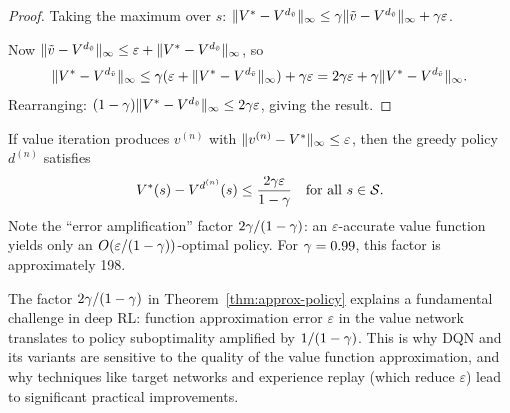 \documentclass[11pt,a4paper]{article}
\begin{document}
\begin{proof}
Taking the maximum over $s$:
$\|V^* - V^{d_{\tilde{v}}}\|_\infty \leq
\gamma \|\tilde{v} - V^{d_{\tilde{v}}}\|_\infty +
\gamma\varepsilon$.

Now $\|\tilde{v} - V^{d_{\tilde{v}}}\|_\infty \leq
\varepsilon + \|V^* - V^{d_{\tilde{v}}}\|_\infty$, so
\[
    \|V^* - V^{d_{\tilde{v}}}\|_\infty \leq
    \gamma(\varepsilon + \|V^* - V^{d_{\tilde{v}}}\|_\infty)
    + \gamma\varepsilon
    = 2\gamma\varepsilon +
    \gamma \|V^* - V^{d_{\tilde{v}}}\|_\infty.
\]
Rearranging: $(1-\gamma)\|V^* - V^{d_{\tilde{v}}}\|_\infty
\leq 2\gamma\varepsilon$, giving the result.
\end{proof}

\begin{keyresult}[title={Near-Optimal Policy from Approximate VI}]
\label{kr:near-optimal}
If value iteration produces $v^{(n)}$ with
$\|v^{(n)} - V^*\|_\infty \leq \varepsilon$, then the greedy
policy $d^{(n)}$ satisfies
\[
    V^*(s) - V^{d^{(n)}}(s) \leq
    \frac{2\gamma\varepsilon}{1-\gamma}
    \quad \text{for all } s \in \mathcal{S}.
\]
Note the ``error amplification'' factor $2\gamma/(1-\gamma)$:
an $\varepsilon$-accurate value function yields only an
$O(\varepsilon/(1-\gamma))$-optimal policy. For
$\gamma = 0.99$, this factor is approximately 198.
\end{keyresult}

\begin{rlconnection}[title={Error Amplification in Deep RL}]
The factor $2\gamma/(1-\gamma)$ in
Theorem~\ref{thm:approx-policy} explains a fundamental challenge
in deep RL: function approximation error $\varepsilon$ in the
value network translates to policy suboptimality amplified by
$1/(1-\gamma)$. This is why DQN and its variants are sensitive
to the quality of the value function approximation, and why
techniques like target networks and experience replay (which reduce
$\varepsilon$) lead to significant practical improvements.
\end{rlconnection}
\end{document}
